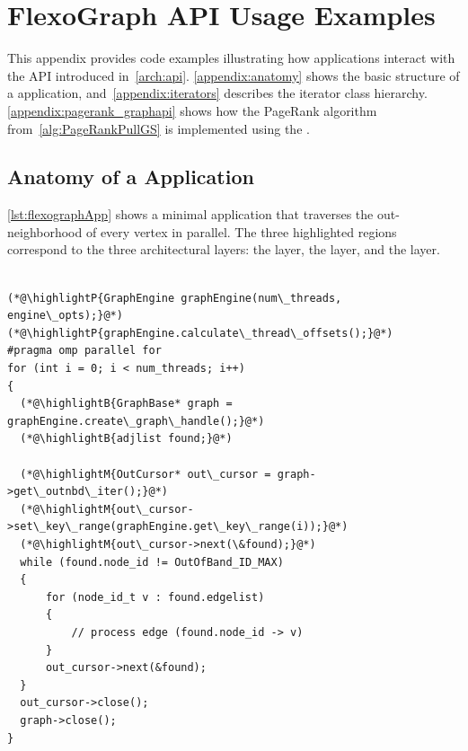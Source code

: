\chapter{FlexoGraph API Usage Examples}
\label{chap:appendix:api}

This appendix provides code examples illustrating how applications interact with the \project{} API introduced in~\autoref{arch:api}.
\autoref{appendix:anatomy} shows the basic structure of a \project{} application, and~\autoref{appendix:iterators} describes the iterator class hierarchy.
\autoref{appendix:pagerank_graphapi} shows how the PageRank algorithm from~\autoref{alg:PageRankPullGS} is implemented using the \api{}.

\section{Anatomy of a \project{} Application}
\label{appendix:anatomy}

\autoref{lst:flexographApp} shows a minimal application that traverses the out-neighborhood of every vertex in parallel.
The three highlighted regions correspond to the three architectural layers: the  layer, the  layer, and the  layer.

\begin{lstlisting}[style=cpp,label=lst:flexographApp,caption={Example application using the \api{} to scan out-neighborhoods in parallel.  \highlightP{GraphEngine} owns the connection and computes partitions; \highlightB{GraphBase} provides a per-thread handle; \highlightM{OutCursor} iterates a partition's neighborhoods.},captionpos=b]

(*@\highlightP{GraphEngine graphEngine(num\_threads, engine\_opts);}@*)
(*@\highlightP{graphEngine.calculate\_thread\_offsets();}@*)
#pragma omp parallel for
for (int i = 0; i < num_threads; i++)
{
  (*@\highlightB{GraphBase* graph = graphEngine.create\_graph\_handle();}@*)
  (*@\highlightB{adjlist found;}@*)

  (*@\highlightM{OutCursor* out\_cursor = graph->get\_outnbd\_iter();}@*)
  (*@\highlightM{out\_cursor->set\_key\_range(graphEngine.get\_key\_range(i));}@*)
  (*@\highlightM{out\_cursor->next(\&found);}@*)
  while (found.node_id != OutOfBand_ID_MAX)
  {
      for (node_id_t v : found.edgelist)
      {
          // process edge (found.node_id -> v)
      }
      out_cursor->next(&found);
  }
  out_cursor->close();
  graph->close();
}
\end{lstlisting}

